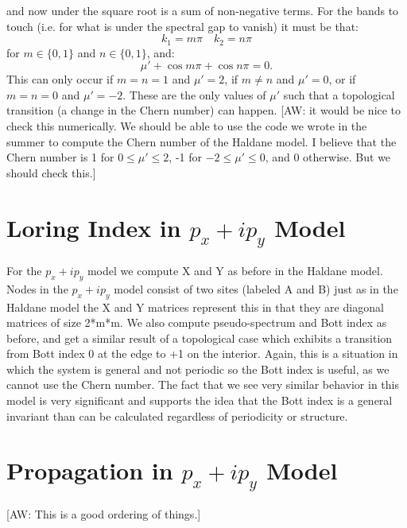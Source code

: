\documentclass[a4paper]{article}
\newcommand{\aw}[1]{{\color{blue} [AW: #1]}}
\begin{document}
and now under the square root is a sum of non-negative terms. For the bands to touch (i.e. for what is under the spectral gap to vanish) it must be that:
\begin{equation}
	k_1 = m \pi \quad k_2 = n \pi
\end{equation}
for $m \in \{0,1\}$ and $n \in \{0,1\}$, and:
\begin{equation}
	\mu' + \cos m \pi + \cos n \pi = 0.
\end{equation}
This can only occur if $m = n = 1$ and $\mu' = 2$, if $m \neq n$ and $\mu' = 0$, or if $m = n = 0$ and $\mu' = - 2$. These are the only values of $\mu'$ such that a topological transition (a change in the Chern number) can happen. \aw{it would be nice to check this numerically. We should be able to use the code we wrote in the summer to compute the Chern number of the Haldane model. I believe that the Chern number is 1 for $0 \leq \mu' \leq 2$, -1 for $- 2 \leq \mu' \leq 0$, and 0 otherwise. But we should check this.}

\section{Loring Index in \texorpdfstring{$p_x + ip_y$}{px + ipy} Model}
For the \texorpdfstring{$p_x + ip_y$}{px + ipy} model we compute X and Y as before in the Haldane model. Nodes in the \texorpdfstring{$p_x + ip_y$}{px + ipy} model consist of two sites (labeled A and B) just as in the Haldane model the X and Y matrices represent this in that they are diagonal matrices of size 2*m*m. We also compute pseudo-spectrum and Bott index as before, and get a similar result of a topological case which exhibits a transition from Bott index 0 at the edge to +1 on the interior. Again, this is a situation in which the system is general and not periodic so the Bott index is useful, as we cannot use the Chern number. The fact that we see very similar behavior in this model is very significant and supports the idea that the Bott index is a general invariant than can be calculated regardless of periodicity or structure.
\section{Propagation in \texorpdfstring{$p_x + ip_y$}{px + ipy} Model}
\aw{This is a good ordering of things.}
\end{document}
